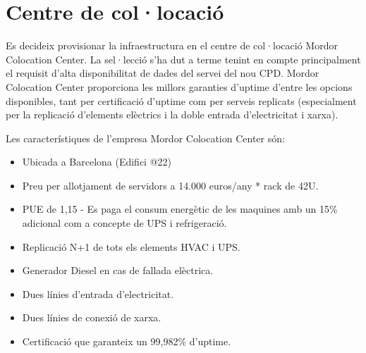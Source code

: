 \section{Centre de col·locació}

Es decideix provisionar la infraestructura en el centre de col·locació Mordor Colocation Center. La sel·lecció s’ha dut a terme tenint en compte principalment el requisit d’alta disponibilitat de dades del servei del nou CPD. Mordor Colocation Center proporciona les millors garanties d'uptime d’entre les opcions disponibles, tant per certificació d'uptime com per serveis replicats (especialment per la replicació d'elements elèctrics i la doble entrada d’electricitat i xarxa).

Les característiques de l’empresa Mordor Colocation Center són:

\begin{itemize}
\item Ubicada a Barcelona (Edifici @22)
\item Preu per allotjament de servidors a 14.000 euros/any * rack de 42U.
\item PUE de 1,15 - Es paga el consum energètic de les maquines amb un 15\% adicional com a concepte de UPS i refrigeració.
\item Replicació N+1 de tots els elements HVAC i UPS.
\item Generador Diesel en cas de fallada elèctrica.
\item Dues línies d’entrada d’electricitat.
\item Dues línies de conexió de xarxa.
\item Certificació que garanteix un 99,982\% d'uptime.
\end{itemize}

